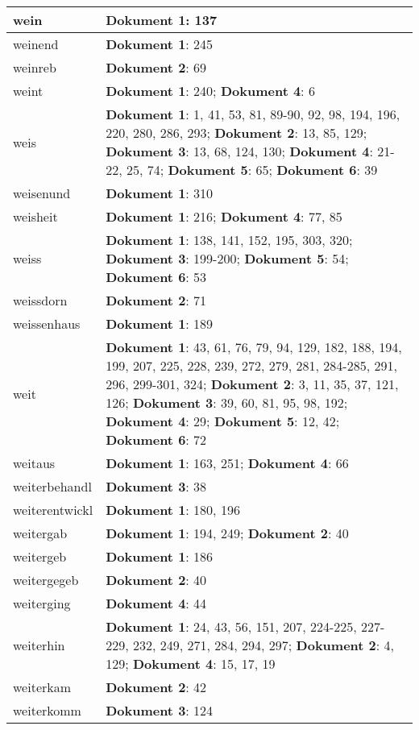\documentclass[a5paper]{article}
\begin{document}
\begin{longtable}[l]{|l|p{3in}|}
\hline
wein & \textbf{Dokument 1}: 137 \\
\hline
weinend & \textbf{Dokument 1}: 245 \\
\hline
weinreb & \textbf{Dokument 2}: 69 \\
\hline
weint & \textbf{Dokument 1}: 240; \textbf{Dokument 4}: 6 \\
\hline
weis & \textbf{Dokument 1}: 1, 41, 53, 81, 89-90, 92, 98, 194, 196, 220, 280, 286, 293; \textbf{Dokument 2}: 13, 85, 129; \textbf{Dokument 3}: 13, 68, 124, 130; \textbf{Dokument 4}: 21-22, 25, 74; \textbf{Dokument 5}: 65; \textbf{Dokument 6}: 39 \\
\hline
weisenund & \textbf{Dokument 1}: 310 \\
\hline
weisheit & \textbf{Dokument 1}: 216; \textbf{Dokument 4}: 77, 85 \\
\hline
weiss & \textbf{Dokument 1}: 138, 141, 152, 195, 303, 320; \textbf{Dokument 3}: 199-200; \textbf{Dokument 5}: 54; \textbf{Dokument 6}: 53 \\
\hline
weissdorn & \textbf{Dokument 2}: 71 \\
\hline
weissenhaus & \textbf{Dokument 1}: 189 \\
\hline
weit & \textbf{Dokument 1}: 43, 61, 76, 79, 94, 129, 182, 188, 194, 199, 207, 225, 228, 239, 272, 279, 281, 284-285, 291, 296, 299-301, 324; \textbf{Dokument 2}: 3, 11, 35, 37, 121, 126; \textbf{Dokument 3}: 39, 60, 81, 95, 98, 192; \textbf{Dokument 4}: 29; \textbf{Dokument 5}: 12, 42; \textbf{Dokument 6}: 72 \\
\hline
weitaus & \textbf{Dokument 1}: 163, 251; \textbf{Dokument 4}: 66 \\
\hline
weiterbehandl & \textbf{Dokument 3}: 38 \\
\hline
weiterentwickl & \textbf{Dokument 1}: 180, 196 \\
\hline
weitergab & \textbf{Dokument 1}: 194, 249; \textbf{Dokument 2}: 40 \\
\hline
weitergeb & \textbf{Dokument 1}: 186 \\
\hline
weitergegeb & \textbf{Dokument 2}: 40 \\
\hline
weiterging & \textbf{Dokument 4}: 44 \\
\hline
weiterhin & \textbf{Dokument 1}: 24, 43, 56, 151, 207, 224-225, 227-229, 232, 249, 271, 284, 294, 297; \textbf{Dokument 2}: 4, 129; \textbf{Dokument 4}: 15, 17, 19 \\
\hline
weiterkam & \textbf{Dokument 2}: 42 \\
\hline
weiterkomm & \textbf{Dokument 3}: 124 \\

\end{longtable}
\end{document}
